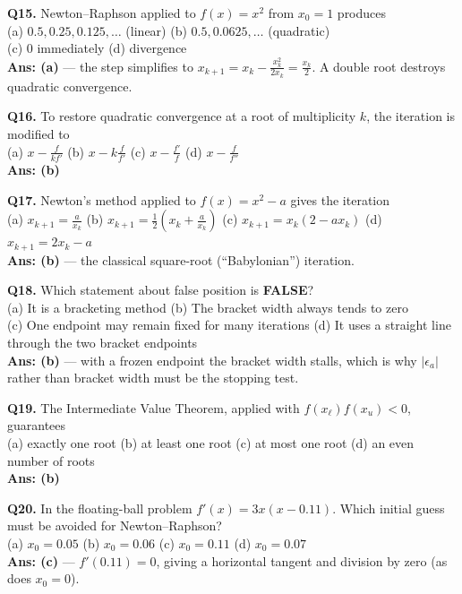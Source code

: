 \begin{mcqbox}
\textbf{Q15.} Newton--Raphson applied to $f(x)=x^2$ from $x_0=1$ produces\\
(a) $0.5, 0.25, 0.125,\dots$ (linear) \quad (b) $0.5, 0.0625,\dots$ (quadratic)\\
(c) $0$ immediately \quad (d) divergence\\
\textbf{Ans: (a)} --- the step simplifies to $x_{k+1} = x_k - \frac{x_k^2}{2x_k} = \frac{x_k}{2}$. A double root destroys quadratic convergence.

\textbf{Q16.} To restore quadratic convergence at a root of multiplicity $k$, the iteration is modified to\\
(a) $x - \frac{f}{k f'}$ \quad (b) $x - k\frac{f}{f'}$ \quad (c) $x - \frac{f'}{f}$ \quad (d) $x - \frac{f}{f''}$\\
\textbf{Ans: (b)}

\textbf{Q17.} Newton's method applied to $f(x) = x^2 - a$ gives the iteration\\
(a) $x_{k+1} = \frac{a}{x_k}$ \quad (b) $x_{k+1} = \frac12\left(x_k + \frac{a}{x_k}\right)$ \quad (c) $x_{k+1} = x_k(2-ax_k)$ \quad (d) $x_{k+1} = 2x_k - a$\\
\textbf{Ans: (b)} --- the classical square-root (``Babylonian'') iteration.

\textbf{Q18.} Which statement about false position is \textbf{FALSE}?\\
(a) It is a bracketing method \quad (b) The bracket width always tends to zero\\
(c) One endpoint may remain fixed for many iterations \quad (d) It uses a straight line through the two bracket endpoints\\
\textbf{Ans: (b)} --- with a frozen endpoint the bracket width stalls, which is why $|\epsilon_a|$ rather than bracket width must be the stopping test.

\textbf{Q19.} The Intermediate Value Theorem, applied with $f(x_\ell)f(x_u)<0$, guarantees\\
(a) exactly one root \quad (b) at least one root \quad (c) at most one root \quad (d) an even number of roots\\
\textbf{Ans: (b)}

\textbf{Q20.} In the floating-ball problem $f'(x) = 3x(x-0.11)$. Which initial guess must be avoided for Newton--Raphson?\\
(a) $x_0 = 0.05$ \quad (b) $x_0 = 0.06$ \quad (c) $x_0 = 0.11$ \quad (d) $x_0 = 0.07$\\
\textbf{Ans: (c)} --- $f'(0.11) = 0$, giving a horizontal tangent and division by zero (as does $x_0=0$).
\end{mcqbox}

